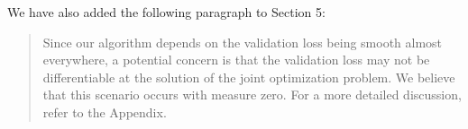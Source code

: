 \documentclass[]{article}
\begin{document}
\begin{enumerate}
		
		We have also added the following paragraph to Section 5:
		\begin{quote}
			Since our algorithm depends on the validation loss being smooth almost everywhere, a potential concern is that the validation loss may not be differentiable at the solution of the joint optimization problem. We believe that this scenario occurs with measure zero. For a more detailed discussion, refer to the Appendix.
		\end{quote}
		
		
	\end{enumerate}



\end{document}
